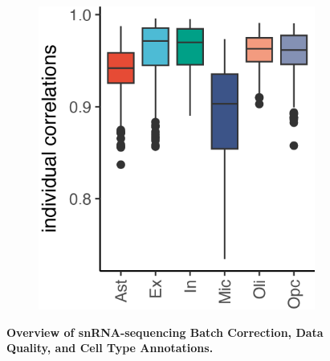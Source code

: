 \begin{figure}[H]
\begin{subfigure}[t]{.2\textwidth}
        \includegraphics[width=\textwidth]{./extended_plots/individual_correlations.png}        
    \end{subfigure}       
    \caption{
        \textbf{Overview of snRNA-sequencing Batch Correction, Data Quality, and Cell Type Annotations.}\\
    }
    \label{fig:snRNA_quality_annotation}
\end{figure}
